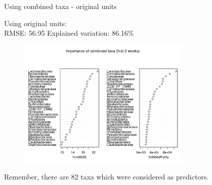 \documentclass{beamer}
\begin{document}
\begin{frame}{Using combined taxa - original units}

  {\scriptsize
    
  \noindent Using original units:\\
  RMSE: 56.95  \hspace{0.05in}  Explained variation: 86.16\%

  \begin{center}
    \begin{figure}
      \includegraphics[width=3.25in]{../all_together/first_two_weeks/orig_units_first_two_weeks_combined_imp_plot}
    \end{figure}
  \end{center}
  \vspace{-0.25in}

\noindent Remember, there are 82 taxa which were considered as predictors.
}

\end{frame}
\end{document}
